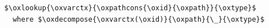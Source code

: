 \begin{lstlisting}
  $\oxlookup{\oxvarctx}{\oxpathcons{\oxid}{\oxpath}}{\oxtype}$
    where $\oxdecompose{\oxvarctx(\oxid)}{\oxpath}{\_}{\oxtype}$
\end{lstlisting}